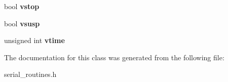 \begin{DoxyCompactItemize}
\item 
bool {\bfseries vstop}\hypertarget{classport_1_1specialCharFlags_a7503db39bed7f5a0f54c4f8a512ea440}{}\label{classport_1_1specialCharFlags_a7503db39bed7f5a0f54c4f8a512ea440}

\item 
bool {\bfseries vsusp}\hypertarget{classport_1_1specialCharFlags_a5e9a59c823d984bab461270166bb6681}{}\label{classport_1_1specialCharFlags_a5e9a59c823d984bab461270166bb6681}

\item 
unsigned int {\bfseries vtime}\hypertarget{classport_1_1specialCharFlags_a7add7bc03f49b288715ac73bd9b52c26}{}\label{classport_1_1specialCharFlags_a7add7bc03f49b288715ac73bd9b52c26}

\end{DoxyCompactItemize}


The documentation for this class was generated from the following file\+:\begin{DoxyCompactItemize}
\item 
serial\+\_\+routines.\+h\end{DoxyCompactItemize}
